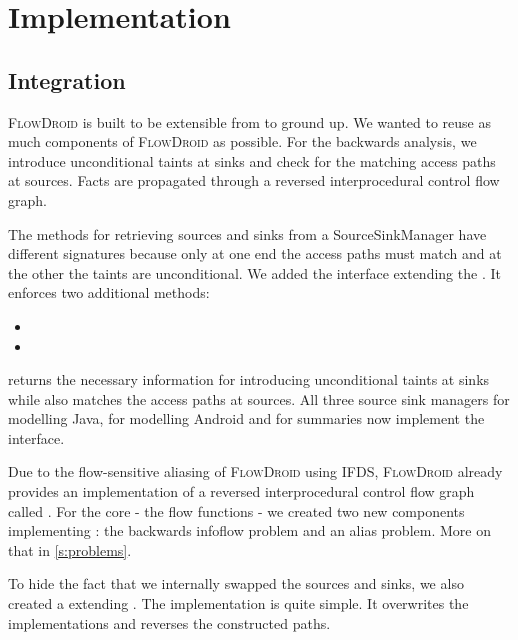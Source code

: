 \documentclass[../draft.tex]{subfiles}
\begin{document}
    \chapter{Implementation}

    \section{Integration}
    \textsc{FlowDroid} is built to be extensible from to ground up. We wanted to reuse as much components of \textsc{FlowDroid} as possible. For the backwards analysis, we introduce unconditional taints at sinks and check for the matching access paths at sources. Facts are propagated through a reversed interprocedural control flow graph.

    The methods for retrieving sources and sinks from a SourceSinkManager have different signatures because only at one end the access paths must match and at the other the taints are unconditional. 
    We added the interface  extending the . It enforces two additional methods:
    \begin{itemize}
        \item {}
        \item {}
    \end{itemize}
     returns the necessary information for introducing unconditional taints at sinks while  also matches the access paths at sources.
    All three source sink managers  for modelling Java,  for modelling Android and  for summaries now implement the  interface.

    Due to the flow-sensitive aliasing of \textsc{FlowDroid} using IFDS, \textsc{FlowDroid} already provides an implementation of a reversed interprocedural control flow graph called .
    For the core - the flow functions - we created two new components implementing : the backwards infoflow problem and an alias problem. More on that in \autoref{s:problems}.

    To hide the fact that we internally swapped the sources and sinks, we also created a  extending . The implementation is quite simple. It overwrites the  implementations and reverses the constructed paths.
\end{document}
